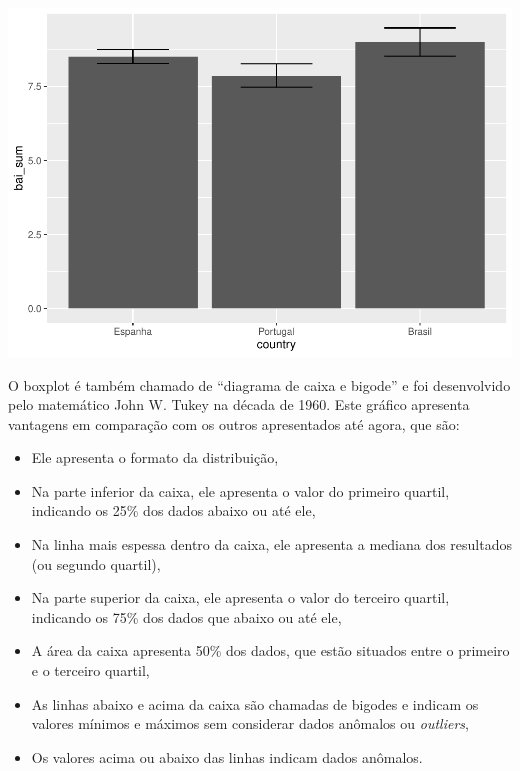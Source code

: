 \documentclass[
]{book}
\providecommand{\tightlist}{%
  \setlength{\itemsep}{0pt}\setlength{\parskip}{0pt}}
\begin{document}
\begin{center}\includegraphics{gitbook-demo_files/figure-latex/unnamed-chunk-20-1} \end{center}

O boxplot é também chamado de ``diagrama de caixa e bigode'' e foi desenvolvido pelo matemático John W. Tukey na década de 1960. Este gráfico apresenta vantagens em comparação com os outros apresentados até agora, que são:

\begin{itemize}
\tightlist
\item
  Ele apresenta o formato da distribuição,\\
\item
  Na parte inferior da caixa, ele apresenta o valor do primeiro quartil, indicando os 25\% dos dados abaixo ou até ele,\\
\item
  Na linha mais espessa dentro da caixa, ele apresenta a mediana dos resultados (ou segundo quartil),\\
\item
  Na parte superior da caixa, ele apresenta o valor do terceiro quartil, indicando os 75\% dos dados que abaixo ou até ele,\\
\item
  A área da caixa apresenta 50\% dos dados, que estão situados entre o primeiro e o terceiro quartil,\\
\item
  As linhas abaixo e acima da caixa são chamadas de bigodes e indicam os valores mínimos e máximos sem considerar dados anômalos ou \emph{outliers},\\
\item
  Os valores acima ou abaixo das linhas indicam dados anômalos.
\end{itemize}
\end{document}
